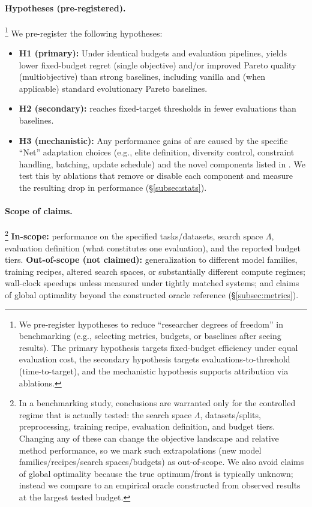 \paragraph{Hypotheses (pre-registered).}\footnote{We pre-register hypotheses to reduce ``researcher degrees of freedom'' in benchmarking
(e.g., selecting metrics, budgets, or baselines after seeing results). The primary hypothesis targets fixed-budget efficiency under equal evaluation cost, the secondary hypothesis targets evaluations-to-threshold (time-to-target), and the mechanistic hypothesis supports attribution via ablations.}
We pre-register the following hypotheses:
\begin{itemize}
    \item \textbf{H1 (primary):} Under identical budgets and evaluation pipelines, \ProposedMethodName{} yields lower fixed-budget regret
    (single objective) and/or improved Pareto quality (multiobjective) than strong baselines, including vanilla \BackboneName{}
    and (when applicable) standard evolutionary Pareto baselines.
    \item \textbf{H2 (secondary):} \ProposedMethodName{} reaches fixed-target thresholds in fewer evaluations than baselines.
    \item \textbf{H3 (mechanistic):} Any performance gains of \ProposedMethodName{} are caused by the specific ``Net'' adaptation choices
(e.g., elite definition, diversity control, constraint handling, batching, update schedule) and the novel components listed in \NoveltyDetails{}.
We test this by ablations that remove or disable each component and measure the resulting drop in performance (\S\ref{subsec:stats}).
\end{itemize}

\paragraph{Scope of claims.}\footnote{In a benchmarking study, conclusions are warranted only for the controlled regime that is actually tested:
the search space \(\Lambda\), datasets/splits, preprocessing, training recipe, evaluation definition, and budget tiers. Changing any of these can
change the objective landscape and relative method performance, so we mark such extrapolations (new model families/recipes/search spaces/budgets)
as out-of-scope. We also avoid claims of global optimality because the true optimum/front is typically unknown; instead we compare to an empirical
oracle constructed from observed results at the largest tested budget.}
\textbf{In-scope:} performance on the specified tasks/datasets, search space \(\Lambda\), evaluation definition (what constitutes one evaluation),
and the reported budget tiers.
\textbf{Out-of-scope (not claimed):} generalization to different model families, training recipes, altered search spaces, or substantially different
compute regimes; wall-clock speedups unless measured under tightly matched systems; and claims of global optimality beyond the constructed oracle
reference (\S\ref{subsec:metrics}).
